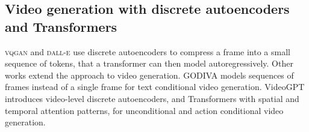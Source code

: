 \subsection*{Video generation with discrete autoencoders and Transformers}

\textsc{vqgan} \citep{vqgan} and \textsc{dall-e} \citep{ramesh} use discrete autoencoders to compress a frame into a small sequence of tokens, that a transformer can then model autoregressively. Other works extend the approach to video generation. GODIVA \citep{wu_godiva} models sequences of frames instead of a single frame for text conditional video generation. VideoGPT \citep{yan_videogpt} introduces video-level discrete autoencoders, and Transformers with spatial and temporal attention patterns, for unconditional and action conditional video generation. 



